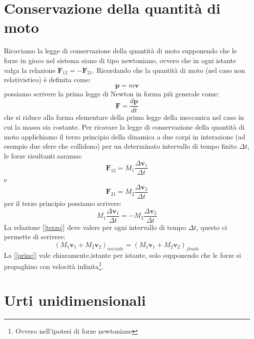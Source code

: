 \documentclass[a4paper,10pt,oneside]{article}
\begin{document}
\thispagestyle{empty}
\section*{Conservazione della quantità di moto}

\vspace{4cm}

Ricaviamo la legge di conservazione della quantità di moto supponendo che le forze in gioco nel sistema siano di tipo newtoniano, ovvero che in ogni istante valga la relazione $\mathbf{F}_{12}=-\mathbf{F}_{21}$.
Ricordando che la quantità di moto (nel caso non relativistico) è definita come:
\begin{equation}
 \mathbf{p}=m\mathbf{v}
\end{equation}
possiamo scrivere la prima legge di Newton in forma più generale come:
\begin{equation}
 \mathbf{F}=\frac{d\mathbf{p}}{dt}
\end{equation}
che si riduce alla forma elementare della prima legge della meccanica nel caso in cui la massa sia costante.
Per ricavare la legge di conservazione della quantità di moto applichiamo il terzo principio della dinamica a due corpi in interazione (ad esempio due sfere che collidono) per un determinato intervallo di tempo finito $\Delta t$, le forze risultanti saranno:
\begin{equation}
 \mathbf{F}_{12}=M_1\frac{\Delta \mathbf{v}_1}{\Delta t}
\end{equation}
e
\begin{equation}
 \mathbf{F}_{21}=M_2\frac{\Delta \mathbf{v}_2}{\Delta t}
\end{equation}
per il terzo principio possiamo scrivere:
\begin{equation}\label{terzo}
 M_1\frac{\Delta \mathbf{v}_1}{\Delta t}=-M_2\frac{\Delta \mathbf{v}_2}{\Delta t}
\end{equation}
La relazione [\ref{terzo}] deve valere per ogni intervallo di tempo $\Delta t$, questo ci permette di scrivere:
\begin{equation}\label{princ}
 (M_1\mathbf{v}_1+M_2\mathbf{v}_2)_{iniziale}=(M_1\mathbf{v}_1+M_2\mathbf{v}_2)_{finale}
\end{equation}
La [\ref{princ}] vale chiaramente,istante per istante, solo supponendo che le forze si propaghino con velocità infinita\footnote{Ovvero nell'ipotesi di forze newtoniane}.

\section*{Urti unidimensionali}
\end{document}
